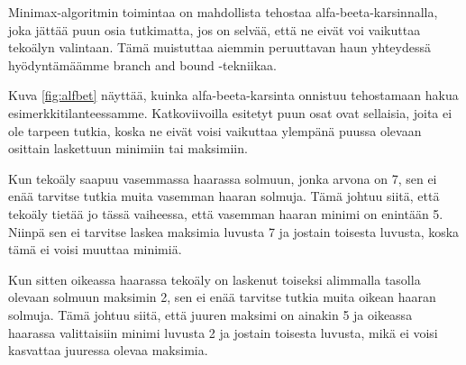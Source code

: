 Minimax-algoritmin toimintaa on mahdollista tehostaa
alfa-beeta-karsinnalla, joka jättää puun osia tutkimatta,
jos on selvää, että ne eivät voi vaikuttaa tekoälyn valintaan.
Tämä muistuttaa aiemmin peruuttavan haun yhteydessä
hyödyntämäämme branch and bound -tekniikaa.

Kuva \ref{fig:alfbet} näyttää, kuinka alfa-beeta-karsinta
onnistuu tehostamaan hakua esimerkkitilanteessamme.
Katkoviivoilla esitetyt puun osat ovat sellaisia,
joita ei ole tarpeen tutkia, koska ne eivät voisi vaikuttaa
ylempänä puussa olevaan osittain laskettuun minimiin tai maksimiin.

Kun tekoäly saapuu vasemmassa haarassa solmuun,
jonka arvona on 7, sen ei enää tarvitse tutkia muita
vasemman haaran solmuja. Tämä johtuu siitä, että tekoäly
tietää jo tässä vaiheessa, että vasemman haaran minimi
on enintään 5. Niinpä sen ei tarvitse laskea maksimia luvusta
7 ja jostain toisesta luvusta, koska tämä ei voisi muuttaa minimiä.

Kun sitten oikeassa haarassa tekoäly on laskenut
toiseksi alimmalla tasolla olevaan solmuun
maksimin 2, sen ei enää tarvitse tutkia muita oikean haaran solmuja.
Tämä johtuu siitä, että juuren maksimi on ainakin 5 ja
oikeassa haarassa valittaisiin minimi luvusta 2 ja jostain toisesta luvusta,
mikä ei voisi kasvattaa juuressa olevaa maksimia.
